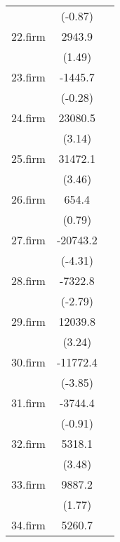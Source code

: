 {\begin{tabular}{l*{2}{c}}
            &     (-0.87)         &                     \\
[1em]
22.firm     &      2943.9         &                     \\
            &      (1.49)         &                     \\
[1em]
23.firm     &     -1445.7         &                     \\
            &     (-0.28)         &                     \\
[1em]
24.firm     &     23080.5\sym{**} &                     \\
            &      (3.14)         &                     \\
[1em]
25.firm     &     31472.1\sym{***}&                     \\
            &      (3.46)         &                     \\
[1em]
26.firm     &       654.4         &                     \\
            &      (0.79)         &                     \\
[1em]
27.firm     &    -20743.2\sym{***}&                     \\
            &     (-4.31)         &                     \\
[1em]
28.firm     &     -7322.8\sym{**} &                     \\
            &     (-2.79)         &                     \\
[1em]
29.firm     &     12039.8\sym{**} &                     \\
            &      (3.24)         &                     \\
[1em]
30.firm     &    -11772.4\sym{***}&                     \\
            &     (-3.85)         &                     \\
[1em]
31.firm     &     -3744.4         &                     \\
            &     (-0.91)         &                     \\
[1em]
32.firm     &      5318.1\sym{***}&                     \\
            &      (3.48)         &                     \\
[1em]
33.firm     &      9887.2         &                     \\
            &      (1.77)         &                     \\
[1em]
34.firm     &      5260.7\sym{*}  &                     \\

\end{tabular}}
